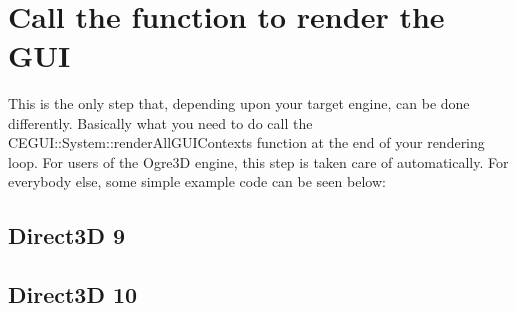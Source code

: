 ~\newline
 \hypertarget{rendering_tutorial_rendering_tutorial_draw}{}\section{Call the function to render the G\+UI}\label{rendering_tutorial_rendering_tutorial_draw}
This is the only step that, depending upon your target engine, can be done differently. Basically what you need to do call the C\+E\+G\+U\+I\+::\+System\+::render\+All\+G\+U\+I\+Contexts function at the end of your rendering loop. For users of the Ogre3D engine, this step is taken care of automatically. For everybody else, some simple example code can be seen below\+: \hypertarget{rendering_tutorial_rendering_tutorial_draw_d3d9}{}\subsection{Direct3\+D 9}\label{rendering_tutorial_rendering_tutorial_draw_d3d9}

\begin{DoxyCode}{0}
\DoxyCodeLine{\textcolor{comment}{// Start the scene}}
\DoxyCodeLine{\textcolor{comment}{// clear display}}
\DoxyCodeLine{\textcolor{comment}{// user function to draw 3D scene}}
\DoxyCodeLine{}
\DoxyCodeLine{    \textcolor{comment}{// draw GUI}}
\DoxyCodeLine{}
\DoxyCodeLine{\textcolor{comment}{// end the scene}}
\DoxyCodeLine{\textcolor{comment}{// finally present the frame.}}
\end{DoxyCode}
\hypertarget{rendering_tutorial_rendering_tutorial_draw_d3d10}{}\subsection{Direct3\+D 10}\label{rendering_tutorial_rendering_tutorial_draw_d3d10}

